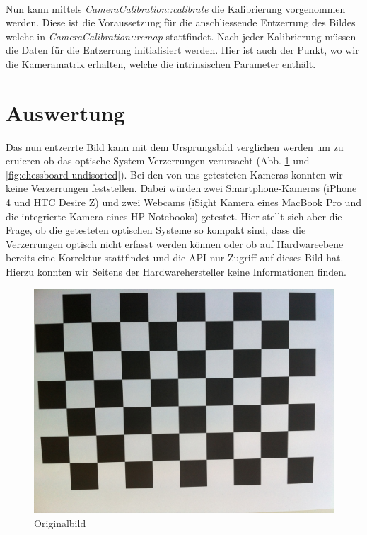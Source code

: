\paragraph{} Nun kann mittels \textit{CameraCalibration::calibrate} die Kalibrierung vorgenommen werden. Diese ist die Voraussetzung für die anschliessende Entzerrung des Bildes welche in \textit{CameraCalibration::remap} stattfindet. Nach jeder Kalibrierung müssen die Daten für die Entzerrung initialisiert werden. Hier ist auch der Punkt, wo wir die Kameramatrix erhalten, welche die intrinsischen Parameter enthält.

\section{Auswertung} Das nun entzerrte Bild kann mit dem Ursprungsbild verglichen werden um zu eruieren ob das optische System Verzerrungen verursacht (Abb. \ref{fig:chessboard-disorted} und \ref{fig:chessboard-undisorted}). Bei den von uns getesteten Kameras konnten wir keine Verzerrungen feststellen. Dabei würden zwei Smartphone-Kameras (iPhone 4 und HTC Desire Z) und zwei Webcams (iSight Kamera eines MacBook Pro und die integrierte Kamera eines HP Notebooks) getestet. Hier stellt sich aber die Frage, ob die getesteten optischen Systeme so kompakt sind, dass die Verzerrungen optisch nicht erfasst werden können oder ob auf Hardwareebene bereits eine Korrektur stattfindet und die API nur Zugriff auf dieses Bild hat. Hierzu konnten wir Seitens der Hardwarehersteller keine Informationen finden.

\begin{figure}[!ht]
\centering
\includegraphics[scale=0.1]{images/chessboard-disorted.jpg} 
\caption{Originalbild}
\label{fig:chessboard-disorted}
\end{figure}

